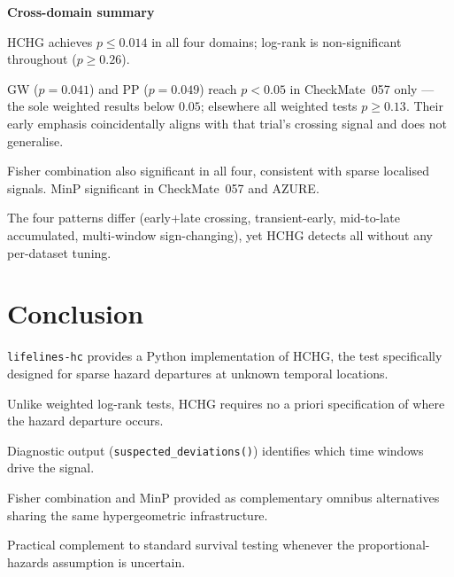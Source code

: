 \documentclass[unnumsec,webpdf,contemporary,large]{oup-authoring-template}
\let\origitemize\itemize
\let\origenditemize\enditemize
\renewenvironment{itemize}{%
  \origitemize
  \setlength{\itemsep}{1pt}%
  \setlength{\parskip}{0pt}%
  \setlength{\topsep}{3pt}%
}{\origenditemize}
\begin{document}
\textbf{Cross-domain summary}
\begin{itemize}
  \item HCHG achieves $p \leq 0.014$ in all four domains; log-rank is
        non-significant throughout ($p \geq 0.26$).
  \item GW ($p=0.041$) and PP ($p=0.049$) reach $p<0.05$ in CheckMate~057
        only — the sole weighted results below $0.05$; elsewhere all
        weighted tests $p \geq 0.13$. Their early emphasis coincidentally
        aligns with that trial's crossing signal and does not generalise.
  \item Fisher combination also significant in all four, consistent
        with sparse localised signals. MinP significant in CheckMate~057
        and AZURE.
  \item The four patterns differ (early+late crossing, transient-early,
        mid-to-late accumulated, multi-window sign-changing), yet HCHG
        detects all without any per-dataset tuning.
\end{itemize}


\section{Conclusion}

\begin{itemize}
  \item \texttt{lifelines-hc} provides a Python implementation of HCHG,
        the test specifically designed for sparse hazard departures at
        unknown temporal locations.
  \item Unlike weighted log-rank tests, HCHG requires no a priori
        specification of where the hazard departure occurs.
  \item Diagnostic output (\texttt{suspected\_deviations()}) identifies
        which time windows drive the signal.
  \item Fisher combination and MinP provided as complementary omnibus
        alternatives sharing the same hypergeometric infrastructure.
  \item Practical complement to standard survival testing whenever the
        proportional-hazards assumption is uncertain.
\end{itemize}


\end{document}
